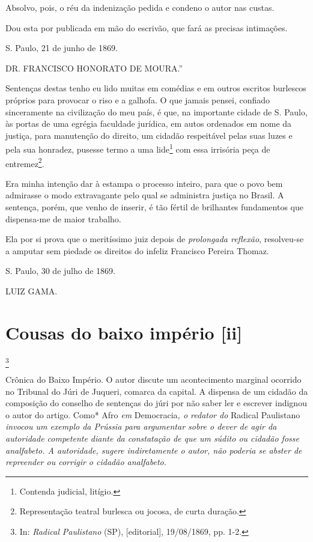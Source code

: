 Absolvo, pois, o réu da indenização pedida e condeno o autor nas custas.

Dou esta por publicada em mão do escrivão, que fará as precisas
intimações.

S. Paulo, 21 de junho de 1869.

DR. FRANCISCO HONORATO DE MOURA.''

Sentenças destas tenho eu lido muitas em comédias e em outros escritos
burlescos próprios para provocar o riso e a galhofa. O que jamais
pensei, confiado sinceramente na civilização do meu país, é que, na
importante cidade de S. Paulo, às portas de uma egrégia faculdade
jurídica, em autos ordenados em nome da justiça, para manutenção do
direito, um cidadão respeitável pelas suas luzes e pela sua honradez,
pusesse termo a uma lide\footnote{Contenda judicial, litígio.} com
essa irrisória peça de entremez\footnote{Representação teatral
  burlesca ou jocosa, de curta duração.}.

Era minha intenção dar à estampa o processo inteiro, para que o povo bem
admirasse o modo extravagante pelo qual se administra justiça no Brasil.
A sentença, porém, que venho de inserir, é tão fértil de brilhantes
fundamentos que dispensa-me de maior trabalho.

Ela por si prova que o meritíssimo juiz depois de \emph{prolongada
reflexão}, resolveu-se a amputar sem piedade os direitos do infeliz
Francisco Pereira Thomaz.

S. Paulo, 30 de julho de 1869.

LUIZ GAMA.

\chapter{Cousas do baixo império {[}ii{]}}\footnote{In: \emph{Radical
  Paulistano} (SP), {[}editorial{]}, 19/08/1869, pp. 1-2.}

\begin{didascalia}
Crônica do Baixo Império. O autor discute um acontecimento marginal
ocorrido no Tribunal do Júri de Juqueri, comarca da capital. A dispensa
de um cidadão da composição do conselho de sentenças do júri por não
saber ler e escrever indignou o autor do artigo. Como* Afro \emph{em}
Democracia\emph{, o redator do} Radical Paulistano \emph{invocou um
exemplo da Prússia para argumentar sobre o dever de agir da autoridade
competente diante da constatação de que um súdito ou cidadão fosse
analfabeto. A autoridade, sugere indiretamente o autor, não poderia se
abster de repreender ou corrigir o cidadão analfabeto.}
\end{didascalia}

